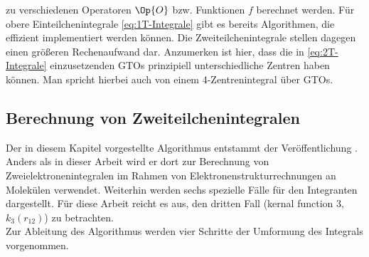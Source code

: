 %
zu verschiedenen Operatoren $\Op{O}$ bzw. Funktionen $f$ berechnet werden. Für 
obere Einteilchenintegrale \ref{eq:1T-Integrale} gibt es bereits Algorithmen, 
die effizient implementiert werden können. Die Zweiteilchenintegrale stellen 
dagegen einen größeren Rechenaufwand dar. Anzumerken ist hier, dass die in 
\ref{eq:2T-Integrale} einzusetzenden GTOs prinzipiell unterschiedliche 
Zentren 
haben können. Man spricht hierbei auch von einem 4-Zentrenintegral über GTOs.
%
%
%
\subsection{Berechnung von Zweiteilchenintegralen}\label{sec:Algorithmus}
%
Der in diesem Kapitel vorgestellte Algorithmus entstammt der Veröffentlichung 
\cite{av:1a}. Anders als in dieser Arbeit wird er dort zur Berechnung von 
Zweielektronenintegralen im Rahmen von Elektronenstrukturrechnungen an 
Molekülen verwendet. Weiterhin werden sechs spezielle Fälle für den Integranten 
dargestellt. Für diese Arbeit reicht es aus, den dritten Fall 
(kernal function 3, $k_3(r_{12})$) zu betrachten.\\ 
%
Zur Ableitung des Algorithmus werden vier Schritte der Umformung des Integrals 
vorgenommen. 
%
%
%
